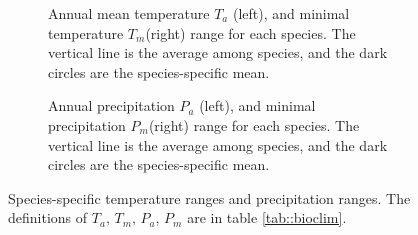 \documentclass[letterpaper, 12pt]{article}
\theoremstyle{theo}
\begin{document}
\begin{refsection}
\begin{onehalfspace}
\begin{figure}[htb]
    \centering
	\begin{subfigure}{0.98\textwidth}
		
		\caption{Annual mean temperature $ T_a $ (left), and minimal temperature $ T_m $(right) range for each species. The vertical line is the average among species, and the dark circles are the species-specific mean.}
		\label{fig::annual_mean_temperature}
	\end{subfigure}
	\medskip
	\begin{subfigure}{0.98\textwidth}
		
		\caption{Annual precipitation $ P_a $ (left), and minimal precipitation $ P_m $(right) range for each species. The vertical line is the average among species, and the dark circles are the species-specific mean.}
		\label{fig::annual_precipitation}
	\end{subfigure}
\caption[Species climatic range]{Species-specific  temperature ranges and  precipitation ranges. The definitions of $ T_a, \, T_m, \, P_a, \, P_m $ are in table \ref{tab::bioclim}.}
\label{fig::speciesClimRange}
\end{figure}


\end{onehalfspace}
\end{refsection}
\end{document}
